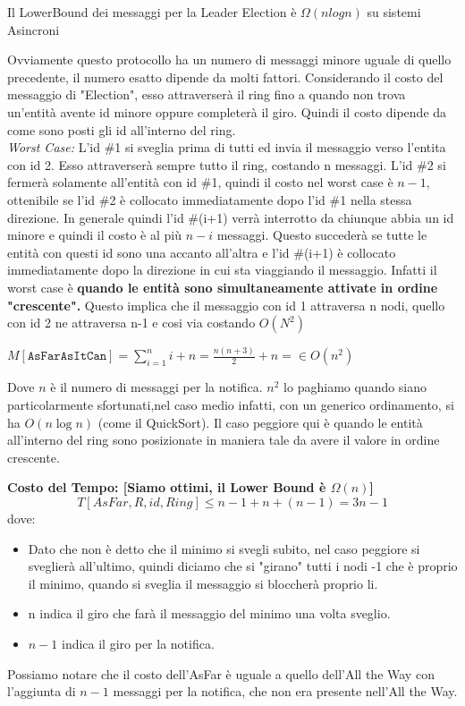 \begin{center}
    Il LowerBound dei messaggi per la Leader Election è $\Omega(nlogn)$ su sistemi Asincroni
\end{center}{}

Ovviamente questo protocollo ha un numero di messaggi minore uguale di quello precedente, il numero esatto dipende da molti fattori. Considerando il costo del messaggio di "Election", esso attraverserà il ring fino a quando non trova un'entità avente id minore oppure completerà il giro. Quindi il costo dipende da come sono posti gli id all'interno del ring.\\
\textit{Worst Case:} L'id \#1 si sveglia prima di tutti ed invia il messaggio verso l'entita con id 2. Esso attraverserà sempre tutto il ring, costando n messaggi. L'id \#2 si fermerà solamente all'entità con id \#1, quindi il costo nel worst case è $n-1$, ottenibile se l'id \#2 è collocato immediatamente dopo l'id \#1 nella stessa direzione. In generale quindi l'id \#(i+1) verrà interrotto da chiunque abbia un id minore e quindi il costo è al più $n-i$ messaggi. Questo succederà se tutte le entità con questi id sono una accanto all'altra e l'id \#(i+1) è collocato immediatamente dopo la direzione in cui sta viaggiando il messaggio. Infatti il worst case è \textbf{quando le entità sono simultaneamente attivate in ordine "crescente".}
Questo implica che il messaggio con id 1 attraversa n nodi, quello con id 2 ne attraversa n-1 e cosi via costando $O(N^2)$
\begin{center}
  $M[\texttt{AsFarAsItCan}] = \sum_{i=1}^{n} i + n = \frac{n(n+3)}{2} + n = \in O(n^2)$
\end{center}
Dove $n$ è il numero di messaggi per la notifica.
$n^2$ lo paghiamo quando siano particolarmente sfortunati,nel caso medio infatti, con un generico ordinamento, si ha $O(n \log n)$ (come il QuickSort).
Il caso peggiore qui è quando le entità all'interno del ring sono posizionate in maniera tale da avere il valore in ordine crescente.

\textbf{Costo del Tempo: [Siamo ottimi, il Lower Bound è $\Omega(n)$]}
$$T[AsFar,R,id,Ring] \leq n-1 + n + (n-1) = 3n - 1$$
dove:
\begin{itemize}
    \item Dato che non è detto che il minimo si svegli subito, nel caso peggiore si sveglierà all'ultimo, quindi diciamo che si "girano" tutti i nodi -1 che è proprio il minimo, quando si sveglia il messaggio si bloccherà proprio li.
    \item n indica il giro che farà il messaggio del minimo una volta sveglio.
    \item $n - 1$ indica il giro per la notifica.
\end{itemize}
Possiamo notare che il costo dell'AsFar è uguale a quello dell'All the Way con l'aggiunta di $n-1$ messaggi per la notifica, che non era presente nell'All the Way.




